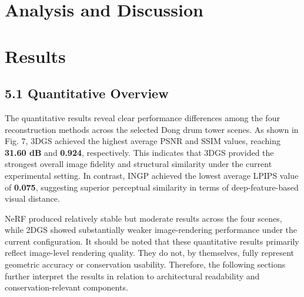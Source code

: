 \section{Analysis and Discussion}
\label{sec:analysis}

\section{Results}\label{results}

\subsection{5.1 Quantitative
Overview}\label{quantitative-overview}

The quantitative results reveal clear performance differences among
the four reconstruction methods across the selected Dong drum tower
scenes. As shown in Fig. 7, 3DGS achieved the highest average PSNR and
SSIM values, reaching \textbf{31.60 dB} and \textbf{0.924},
respectively. This indicates that 3DGS provided the strongest overall
image fidelity and structural similarity under the current experimental
setting. In contrast, INGP achieved the lowest average LPIPS value of
\textbf{0.075}, suggesting superior perceptual similarity in terms of
deep-feature-based visual distance.

NeRF produced relatively stable but moderate results across the four
scenes, while 2DGS showed substantially weaker image-rendering
performance under the current configuration. It should be noted that
these quantitative results primarily reflect image-level rendering
quality. They do not, by themselves, fully represent geometric accuracy
or conservation usability. Therefore, the following sections further
interpret the results in relation to architectural readability and
conservation-relevant components.

